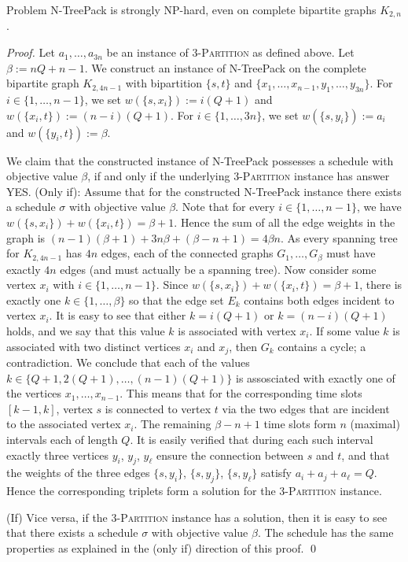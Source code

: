 \documentclass[runningheads]{llncs}
\newcommand{\set}[1]{\{ #1 \}}
\newcommand{\fromto}[2]{\set{#1, \ldots, #2}}
\newcommand{\xxxNTP}{{\sc N-TreePack}}
\begin{document}
\begin{theorem}
\label{thm:hardness_complete_bipartite}
Problem {\xxxNTP} is strongly NP-hard, even on complete bipartite graphs $K_{2,n}$.
\end{theorem}
\begin{proof}
Let $a_1,\ldots,a_{3n}$ be an instance of \textsc{3-Partition} as defined above. 
Let $\beta := nQ + n - 1$. 
We construct an instance of {\xxxNTP} on the complete bipartite graph $K_{2,4n-1}$ with bipartition
$\set{s, t}$ and $\set{x_1, \ldots, x_{n-1}, y_1, \ldots, y_{3n}}$. 
For $i\in\{1, \dots,n-1\}$, we set $w(\set{s,x_i}):= i(Q + 1)$ and $w(\set{x_i,t}):=(n - i)(Q + 1)$. 
For $i\in\{1,\dots,3n\}$, we set $w(\set{s,y_i}):= a_i$ and $w(\set{y_i,t}):= \beta$. 

We claim that the constructed instance of {\xxxNTP} possesses a schedule with objective value $\beta$, 
if and only if the underlying \textsc{3-Partition} instance has answer YES.
(Only if): Assume that for the constructed {\xxxNTP} instance there exists a schedule $\sigma$ with objective value $\beta$. 
Note that for every $i \in \{1,\dots,n-1\}$, we have $w(\set{s,x_i}) + w(\set{x_i,t}) = \beta + 1$. 
Hence the sum of all the edge weights in the graph is $(n-1)(\beta + 1) + 3n\beta + (\beta - n + 1) = 4\beta n$. 
As every spanning tree for $K_{2, 4n-1}$ has $4n$ edges, each of the connected graphs $G_1,\dots,G_\beta$ 
must have exactly $4n$ edges (and must actually be a spanning tree). 
Now consider some vertex $x_i$ with $i\in\{1,\dots,n-1\}$. 
Since $w(\set{s,x_i}) + w(\set{x_i,t})=\beta+1$, there is exactly one $k\in\fromto{1}{\beta}$ so 
that the edge set $E_k$ contains both edges incident to vertex $x_i$. 
It is easy to see that either $k=i(Q+1)$ or $k=(n-i)(Q+1)$ holds, and we say that this value $k$ 
is associated with vertex $x_i$.
If some value $k$ is associated with two distinct vertices $x_i$ and $x_j$, then $G_k$ contains 
a cycle; a contradiction.
We conclude that each of the values $k\in\set{Q+1,2(Q+1),\ldots,(n-1)(Q+1)}$ is assosciated with
exactly one of the vertices $x_1,\ldots,x_{n-1}$.
This means that for the corresponding time slots $[k-1,k]$, vertex $s$ is connected to vertex $t$
via the two edges that are incident to the associated vertex $x_i$.
The remaining $\beta-n+1$ time slots form $n$ (maximal) intervals each of length $Q$.
It is easily verified that during each such interval exactly three vertices $y_i$, $y_j$, $y_{\ell}$
ensure the connection between $s$ and $t$, and that the weights of the three edges $\{s,y_i\}$,
$\{s,y_j\}$, $\{s,y_{\ell}\}$ satisfy $a_i+a_j+a_{\ell}=Q$.
Hence the corresponding triplets form a solution for the \textsc{3-Partition} instance.

(If) Vice versa, if the \textsc{3-Partition} instance has a solution, then it is easy to see that there exists a schedule $\sigma$
with objective value $\beta$. The schedule has the same properties as explained in the (only if) direction of this proof.
\qed
\end{proof}
\end{document}
